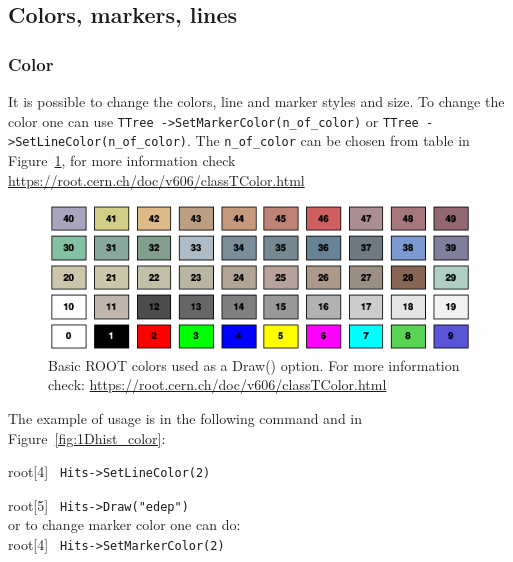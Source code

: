 \documentclass[12pt]{article}
\begin{document}
\subsection{Colors, markers, lines}
\subsubsection{Color}
It is possible to change the colors, line and marker styles and size.
To change the color one can use \verb|TTree ->SetMarkerColor(n_of_color)| or \verb|TTree ->SetLineColor(n_of_color)|. The \verb|n_of_color| can be chosen from table in Figure~\ref{fig:root_colors}, for more information check\\ \href{https://root.cern.ch/doc/v606/classTColor.html}{https://root.cern.ch/doc/v606/classTColor.html}  %

\begin{figure}[h]
\centering
\includegraphics[scale=0.5]{figs/root_colors.png}
\caption{Basic ROOT colors used as a Draw() option. For more information check: \href{https://root.cern.ch/doc/v606/classTColor.html}{https://root.cern.ch/doc/v606/classTColor.html} }
\label{fig:root_colors}
\end{figure}

The example of usage is in the following command and in Figure~\ref{fig:1Dhist_color}:

root[4] \verb| Hits->SetLineColor(2) |

root[5] \verb| Hits->Draw("edep") | \\

or to change marker color one can do:\\

root[4] \verb| Hits->SetMarkerColor(2) |
\end{document}
